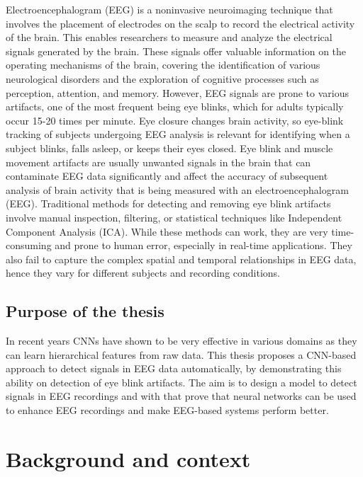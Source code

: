\documentclass[12pt,a4paper,titlepage,openany]{report}
\begin{document}
Electroencephalogram (EEG) is a noninvasive neuroimaging technique that involves the placement of electrodes on the scalp to record the electrical activity of the brain. This enables researchers to measure and analyze the electrical signals generated by the brain. These signals offer valuable information on the operating mechanisms of the brain, covering the identification of various neurological disorders and the exploration of cognitive processes such as perception, attention, and memory.
However, EEG signals are prone to various artifacts, one of the most frequent being eye blinks, which for adults typically occur 15-20 times per minute. Eye closure changes brain activity, so eye-blink tracking of subjects undergoing EEG analysis is relevant for identifying when a subject blinks, falls asleep, or keeps their eyes closed. 
Eye blink and muscle movement artifacts are usually unwanted signals in the brain that can contaminate EEG data significantly and affect the accuracy of subsequent analysis of brain activity that is being measured with an electroencephalogram (EEG). 
Traditional methods for detecting and removing eye blink artifacts involve manual inspection, filtering, or statistical techniques like Independent Component Analysis (ICA). While these methods can work, they are very time-consuming and prone to human error, especially in real-time applications. They also fail to capture the complex spatial and temporal relationships in EEG data, hence they vary for different subjects and recording conditions.

\section{Purpose of the thesis}

In recent years CNNs have shown to be very effective in various domains as they can learn hierarchical features from raw data. 
This thesis proposes a CNN-based approach to detect signals in EEG data automatically, by demonstrating this ability on detection of eye blink artifacts. 
The aim is to design a model to detect signals in EEG recordings and with that prove that neural networks can be used to enhance EEG recordings and make EEG-based systems perform better.


\chapter{Background and context}
\thispagestyle{fancy}
\end{document}
